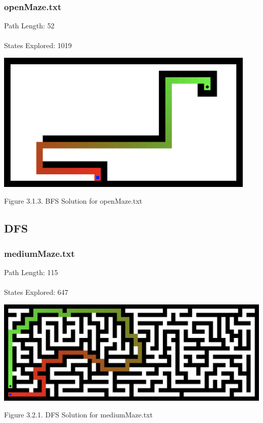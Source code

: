 \documentclass{mcmthesis}
\begin{document}
\subsubsection{openMaze.txt}
Path Length: 52 \\ \\
States Explored: 1019
\begin{center}
\includegraphics[width=12.5cm]{bfs_openmaze.png}
\end{center}
\begin{center}
\small{Figure 3.1.3. BFS Solution for openMaze.txt}
\end{center}

\subsection{DFS}

\subsubsection{mediumMaze.txt}
Path Length: 115 \\ \\
States Explored: 647
\begin{center}
\includegraphics[width=15cm]{dfs_mediummaze.png}
\end{center}
\begin{center}
\small{Figure 3.2.1. DFS Solution for mediumMaze.txt}
\end{center}
\end{document}
